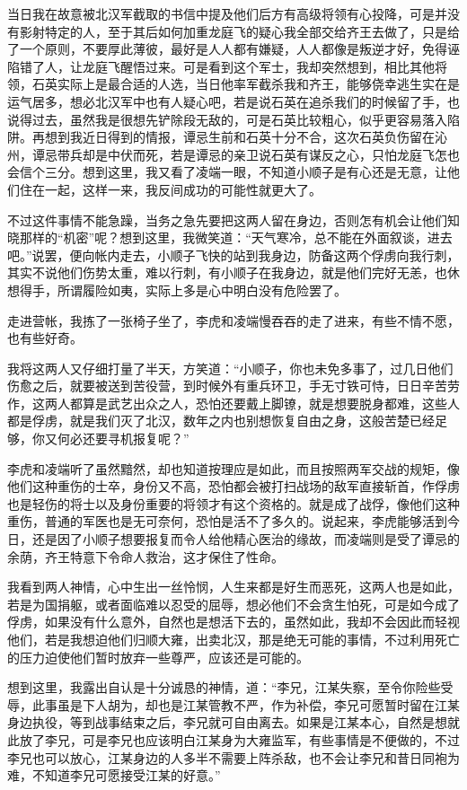 当日我在故意被北汉军截取的书信中提及他们后方有高级将领有心投降，可是并没有影射特定的人，至于其后如何加重龙庭飞的疑心我全部交给齐王去做了，只是给了一个原则，不要厚此薄彼，最好是人人都有嫌疑，人人都像是叛逆才好，免得诬陷错了人，让龙庭飞醒悟过来。可是看到这个军士，我却突然想到，相比其他将领，石英实际上是最合适的人选，当日他率军截杀我和齐王，能够侥幸逃生实在是运气居多，想必北汉军中也有人疑心吧，若是说石英在追杀我们的时候留了手，也说得过去，虽然我是很想先铲除段无敌的，可是石英比较粗心，似乎更容易落入陷阱。再想到我近日得到的情报，谭忌生前和石英十分不合，这次石英负伤留在沁州，谭忌带兵却是中伏而死，若是谭忌的亲卫说石英有谋反之心，只怕龙庭飞怎也会信个三分。想到这里，我又看了凌端一眼，不知道小顺子是有心还是无意，让他们住在一起，这样一来，我反间成功的可能性就更大了。

不过这件事情不能急躁，当务之急先要把这两人留在身边，否则怎有机会让他们知晓那样的“机密”呢？想到这里，我微笑道：“天气寒冷，总不能在外面叙谈，进去吧。”说罢，便向帐内走去，小顺子飞快的站到我身边，防备这两个俘虏向我行刺，其实不说他们伤势太重，难以行刺，有小顺子在我身边，就是他们完好无恙，也休想得手，所谓履险如夷，实际上多是心中明白没有危险罢了。

走进营帐，我拣了一张椅子坐了，李虎和凌端慢吞吞的走了进来，有些不情不愿，也有些好奇。

我将这两人又仔细打量了半天，方笑道：“小顺子，你也未免多事了，过几日他们伤愈之后，就要被送到苦役营，到时候外有重兵环卫，手无寸铁可恃，日日辛苦劳作，这两人都算是武艺出众之人，恐怕还要戴上脚镣，就是想要脱身都难，这些人都是俘虏，就是我们灭了北汉，数年之内也别想恢复自由之身，这般苦楚已经足够，你又何必还要寻机报复呢？”

李虎和凌端听了虽然黯然，却也知道按理应是如此，而且按照两军交战的规矩，像他们这种重伤的士卒，身份又不高，恐怕都会被打扫战场的敌军直接斩首，作俘虏也是轻伤的将士以及身份重要的将领才有这个资格的。就是成了战俘，像他们这种重伤，普通的军医也是无可奈何，恐怕是活不了多久的。说起来，李虎能够活到今日，还是因了小顺子想要报复而令人给他精心医治的缘故，而凌端则是受了谭忌的余荫，齐王特意下令命人救治，这才保住了性命。

我看到两人神情，心中生出一丝怜悯，人生来都是好生而恶死，这两人也是如此，若是为国捐躯，或者面临难以忍受的屈辱，想必他们不会贪生怕死，可是如今成了俘虏，如果没有什么意外，自然也是想活下去的，虽然如此，我却不会因此而轻视他们，若是我想迫他们归顺大雍，出卖北汉，那是绝无可能的事情，不过利用死亡的压力迫使他们暂时放弃一些尊严，应该还是可能的。

想到这里，我露出自认是十分诚恳的神情，道：“李兄，江某失察，至令你险些受辱，此事虽是下人胡为，却也是江某管教不严，作为补偿，李兄可愿暂时留在江某身边执役，等到战事结束之后，李兄就可自由离去。如果是江某本心，自然是想就此放了李兄，可是李兄也应该明白江某身为大雍监军，有些事情是不便做的，不过李兄也可以放心，江某身边的人多半不需要上阵杀敌，也不会让李兄和昔日同袍为难，不知道李兄可愿接受江某的好意。”

